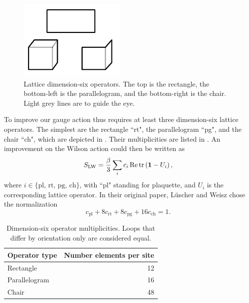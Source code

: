 \begin{figure}
  \centering
  \includegraphics[width=0.5\linewidth]{figs/luescherWeisz.pdf}
  \caption{Lattice dimension-six operators. The top is the rectangle, the
           bottom-left is the parallelogram, and the bottom-right is the 
           chair. Light grey lines are to guide the eye.}
  \label{fig:dim6operators}
\end{figure}
To improve our gauge action thus requires at least three dimension-six
lattice operators. The simplest are the rectangle ``rt", the parallelogram
``pg", and the chair ``ch", which are depicted in 
. Their multiplicities are listed in
. An improvement on the Wilson action could
then be written as
\begin{equation}
  S_\text{LW}=\frac{\beta}{3}\sum_i c_i \mathop{\mathrm{Re}}\tr\left({\mathbf 1}-U_i\right),
\end{equation}
where $i\in\{\text{pl, rt, pg, ch}\}$, with ``pl" standing for plaquette,
and $U_i$ is the corresponding lattice operator. In their original paper,
L\"uscher and Weisz chose the normalization
\begin{equation}\label{eq:LWnorm}
  c_\text{pl}+8c_\text{rt}+8c_\text{pg}+16c_\text{ch}=1.
\end{equation}

\begin{table}
\begin{tabularx}{\linewidth}{LR} \hline\hline
         Operator type & Number elements per site\\\hline
         Rectangle & 12 \\
         Parallelogram & 16 \\
         Chair & 48\\
        \hline\hline 
\end{tabularx}
\caption{Dimension-six operator multiplicities. Loops that differ by
         orientation only are considered equal.}
\label{tab:dim6operators}
\end{table}

